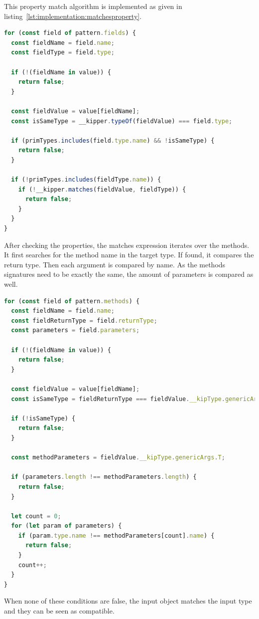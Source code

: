 This property match algorithm is implemented as given in listing~\ref{lst:implementation:matchesproperty}.

\begin{lstlisting}[language=Typescript,caption=Matches operator property comparison,label=lst:implementation:matchesproperty]
for (const field of pattern.fields) {
  const fieldName = field.name;
  const fieldType = field.type;

  if (!(fieldName in value)) {
    return false;
  }

  const fieldValue = value[fieldName];
  const isSameType = __kipper.typeOf(fieldValue) === field.type;

  if (primTypes.includes(field.type.name) && !isSameType) {
    return false;
  }

  if (!primTypes.includes(fieldType.name)) {
    if (!__kipper.matches(fieldValue, fieldType)) {
      return false;
    }
  }
}
\end{lstlisting}

After checking the properties, the matches expression iterates over the methods. It first searches for the method name in the target type. If found, it compares the return type. Then each argument is compared by name. As the methods signatures need to be exactly the same, the amount of parameters is compared as well.

\begin{lstlisting}[language=Typescript,caption=Matches operator method comparison,label=lst:implementation:matchesmethod]
for (const field of pattern.methods) {
  const fieldName = field.name;
  const fieldReturnType = field.returnType;
  const parameters = field.parameters;

  if (!(fieldName in value)) {
    return false;
  }

  const fieldValue = value[fieldName];
  const isSameType = fieldReturnType === fieldValue.__kipType.genericArgs.R;

  if (!isSameType) {
    return false;
  }

  const methodParameters = fieldValue.__kipType.genericArgs.T;

  if (parameters.length !== methodParameters.length) {
    return false;
  }

  let count = 0;
  for (let param of parameters) {
    if (param.type.name !== methodParameters[count].name) {
      return false;
    }
    count++;
  }
}
\end{lstlisting}

When none of these conditions are false, the input object matches the input type and they can be seen as compatible.


